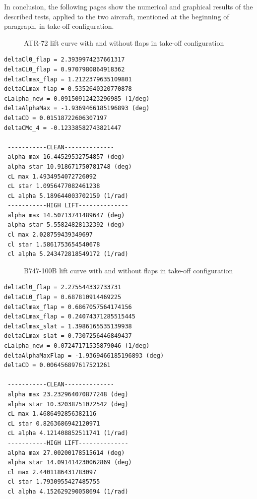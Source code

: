 \bigskip
\noindent
In conclusion, the following pages show the numerical and graphical results of the described tests, applied to the two aircraft, mentioned at the beginning of paragraph, in take-off configuration.
%
\begin{figure}[H]
\centering

\caption{ATR-72 lift curve with and without flaps in take-off configuration}
\label{fig:FlapATR}
\end{figure}

\bigskip
\lstset{language=Java}
\begin{lstlisting}[caption={ATR-72 test results}, captionpos=b, tabsize=2]
deltaCl0_flap = 2.3939974237661317
deltaCL0_flap = 0.9707980864918362
deltaClmax_flap = 1.2122379635109801
deltaCLmax_flap = 0.5352640320770878
cLalpha_new = 0.09150912423296985 (1/deg)
deltaAlphaMax = -1.9369466185196893 (deg)
deltaCD = 0.01518722606307197
deltaCMc_4 = -0.12338582743821447

 -----------CLEAN-------------- 
 alpha max 16.44529532754857 (deg)
 alpha star 10.918671750781748 (deg)
 cL max 1.4934954072726092
 cL star 1.0956477082461238
 cL alpha 5.189644003702159 (1/rad)
 -----------HIGH LIFT-------------- 
 alpha max 14.50713741489647 (deg)
 alpha star 5.55824828132392 (deg)
 cl max 2.028759439349697
 cl star 1.5861753654540678
 cl alpha 5.243472818549172 (1/rad)
\end{lstlisting}
%
\begin{figure}[H]
\centering

\caption{B747-100B lift curve with and without flaps in take-off configuration}
\label{fig:FlapATR}
\end{figure}

\bigskip
\lstset{language=Java}
\begin{lstlisting}[caption={B747-100B test results}, captionpos=b, tabsize=2]
deltaCl0_flap = 2.275544332733731
deltaCL0_flap = 0.687810914469225
deltaClmax_flap = 0.6867057564174156
deltaCLmax_flap = 0.24074371285515445
deltaClmax_slat = 1.3986165535139938
deltaCLmax_slat = 0.7307256446849437
cLalpha_new = 0.07247171535879046 (1/deg)
deltaAlphaMaxFlap = -1.9369466185196893 (deg)
deltaCD = 0.006456897617521261

 -----------CLEAN-------------- 
 alpha max 23.232964070877248 (deg)
 alpha star 10.32038751072542 (deg)
 cL max 1.4686492856382116
 cL star 0.8263686942120971
 cL alpha 4.121408852511741 (1/rad)
 -----------HIGH LIFT-------------- 
 alpha max 27.00200178515614 (deg)
 alpha star 14.091414230062869 (deg)
 cl max 2.4401186431783097
 cl star 1.7930955427485755
 cl alpha 4.152629290058694 (1/rad)
\end{lstlisting}